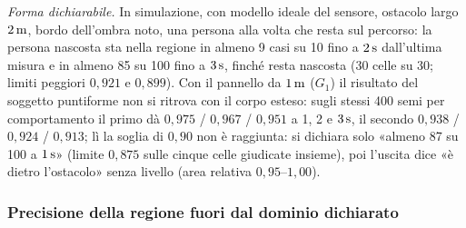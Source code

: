 \emph{Forma dichiarabile.} In simulazione, con modello ideale del sensore, ostacolo largo $2\,\mathrm{m}$, bordo dell'ombra noto, una persona alla volta che resta sul percorso: la persona nascosta sta nella regione in almeno 9 casi su 10 fino a $2\,\mathrm{s}$ dall'ultima misura e in almeno 85 su 100 fino a $3\,\mathrm{s}$, finché resta nascosta (30 celle su 30; limiti peggiori $0{,}921$ e $0{,}899$). Con il pannello da $1\,\mathrm{m}$ ($G_1$) il risultato del soggetto puntiforme non si ritrova con il corpo esteso: sugli stessi 400 semi per comportamento il primo dà $0{,}975$ / $0{,}967$ / $0{,}951$ a 1, 2 e $3\,\mathrm{s}$, il secondo $0{,}938$ / $0{,}924$ / $0{,}913$; lì la soglia di $0{,}90$ non è raggiunta: si dichiara solo «almeno 87 su 100 a $1\,\mathrm{s}$» (limite $0{,}875$ sulle cinque celle giudicate insieme), poi l'uscita dice «è dietro l'ostacolo» senza livello (area relativa $0{,}95$–$1{,}00$).

\subsubsection*{Precisione della regione fuori dal dominio dichiarato}

